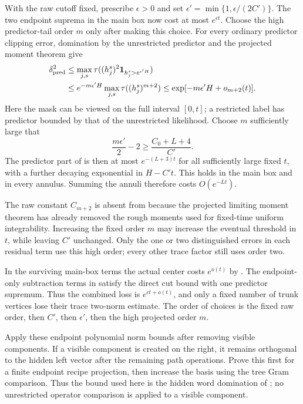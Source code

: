 With the raw cutoff fixed, prescribe $\epsilon>0$ and set
$\epsilon'=\min\{1,\epsilon/(2C')\}$. The two endpoint suprema in
the main box now cost at most $e^{\epsilon t}$. Choose the high
predictor-tail order $m$ only after making this choice. For every ordinary
predictor clipping error, domination by the unrestricted predictor
and the projected moment theorem give
\begin{equation}\label{eq:hidden-predictor-tail}
 \begin{aligned}
 \delta_{\rm pred}^2
 &\leq\max_{j,s}\tau((h_j^s)^2\mathbf 1_{h_j^s>e^{\epsilon'H}})\\
 &\leq e^{-m\epsilon'H}\max_{j,s}\tau((h_j^s)^{m+2})
 \leq\exp[-m\epsilon'H+o_{m+2}(t)].
 \end{aligned}
\end{equation}
Here the mask can be viewed on the full interval $[0,t]$; a
restricted label has predictor bounded by that of the unrestricted
likelihood. Choose $m$ sufficiently large that
\begin{equation}\label{eq:hidden-predictor-cap-choice}
 \frac{m\epsilon'}2-2\geq\frac{C_0+L+4}{C'}.
\end{equation}
The predictor part of  is then at most
$e^{-(L+3)t}$ for all sufficiently large fixed $t$, with a further
decaying exponential in $H-C't$. This holds in the main box and in
every annulus. Summing the annuli therefore costs $O(e^{-Lt})$.

The raw constant $C_{m+2}$ is absent from
 because
the projected limiting moment theorem has already removed the rough
moments used for fixed-time uniform integrability. Increasing the
fixed order $m$ may increase the eventual threshold in $t$, while
leaving $C'$ unchanged. Only the one or two distinguished errors in
each residual term use this high order; every other trace factor
still uses order two.

In the surviving main-box terms the actual center costs $e^{o(t)}$
by . The endpoint-only subtraction
terms in  satisfy the direct cut bound with
one predictor supremum. Thus the combined loss is
$e^{\epsilon t+o(t)}$, and only a fixed number of trunk vertices
lose their trace two-norm estimate. The order of choices is the
fixed raw order, then $C'$, then $\epsilon'$, then the high projected
order $m$.

Apply these endpoint polynomial norm bounds after removing visible
components. If a visible component is created on the right, it
remains orthogonal to the hidden left vector after the remaining
path operations. Prove this first for a finite endpoint recipe
projection, then increase the basis using the tree Gram comparison.
Thus the bound used here is the hidden word domination of
; no unrestricted operator comparison is
applied to a visible component.


